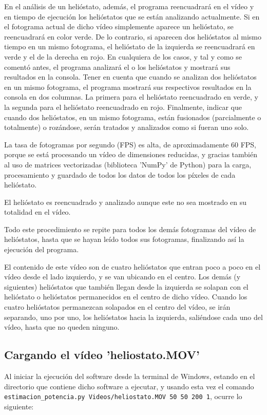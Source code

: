 En el análisis de un helióstato, además, el programa reencuadrará en el vídeo y en tiempo de ejecución los helióstatos que se están analizando actualmente. Si en el fotograma actual de dicho vídeo simplemente aparece un helióstato, se reencuadrará en color verde. De lo contrario, si aparecen dos helióstatos al mismo tiempo en un mismo fotograma, el helióstato de la izquierda se reencuadrará en verde y el de la derecha en rojo. En cualquiera de los casos, y tal y como se comentó antes, el programa analizará el o los helióstatos y mostrará sus resultados en la consola. Tener en cuenta que cuando se analizan dos helióstatos en un mismo fotograma, el programa mostrará sus respectivos resultados en la consola en dos columnas. La primera para el helióstato reencuadrado en verde, y la segunda para el helióstato reencuadrado en rojo. Finalmente, indicar que cuando dos helióstatos, en un mismo fotograma, están fusionados (parcialmente o totalmente) o rozándose, serán tratados y analizados como si fueran uno solo.

La tasa de fotogramas por segundo (FPS) es alta, de aproximadamente 60 FPS, porque se está procesando un vídeo de dimensiones reducidas, y gracias también al uso de matrices vectorizadas (biblioteca 'NumPy' de Python) para la carga, procesamiento y guardado de todos los datos de todos los píxeles de cada helióstato.

El helióstato es reencuadrado y analizado aunque este no sea mostrado en su totalidad en el vídeo.

Todo este procedimiento se repite para todos los demás fotogramas del vídeo de helióstatos, hasta que se hayan leído todos sus fotogramas, finalizando así la ejecución del programa.

El contenido de este vídeo son de cuatro helióstatos que entran poco a poco en el vídeo desde el lado izquierdo, y se van ubicando en el centro. Los demás (y siguientes) helióstatos que también llegan desde la izquierda se solapan con el helióstato o helióstatos permanecidos en el centro de dicho vídeo. Cuando los cuatro helióstatos permanezcan solapados en el centro del vídeo, se irán separando, uno por uno, los helióstatos hacia la izquierda, saliéndose cada uno del vídeo, hasta que no queden ninguno.

\subsection{Cargando el vídeo 'heliostato.MOV'}

Al iniciar la ejecución del software desde la terminal de Windows, estando en el directorio que contiene dicho software a ejecutar, y usando esta vez el comando \verb|estimacion_potencia.py Videos/heliostato.MOV 50 50 200 1|, ocurre lo siguiente:

